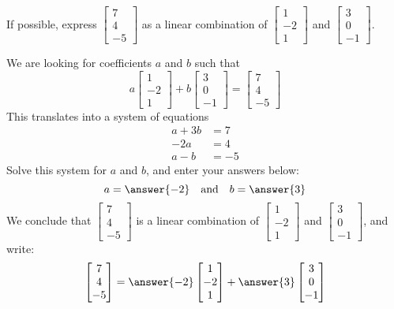 \documentclass{ximera}
\begin{document}
\begin{example}
If possible, express $\begin{bmatrix}7\\4\\-5\end{bmatrix}$ as a linear combination of $\begin{bmatrix}1\\-2\\1\end{bmatrix}$ and $\begin{bmatrix}3\\0\\-1\end{bmatrix}$.
\begin{explanation}
We are looking for coefficients $a$ and $b$ such that 
$$a\begin{bmatrix}1\\-2\\1\end{bmatrix}+b\begin{bmatrix}3\\0\\-1\end{bmatrix}=\begin{bmatrix}7\\4\\-5\end{bmatrix}$$
This translates into a system of equations
\begin{align*}
a+3b&=7\\
-2a&=4\\
a-b&=-5
\end{align*}
Solve this system for $a$ and $b$, and enter your answers below:
$$a=\answer{-2}\quad\text{and}\quad b=\answer{3}$$
We conclude that $\begin{bmatrix}7\\4\\-5\end{bmatrix}$ is a linear combination of $\begin{bmatrix}1\\-2\\1\end{bmatrix}$ and $\begin{bmatrix}3\\0\\-1\end{bmatrix}$, and write:
$$\begin{bmatrix}7\\4\\-5\end{bmatrix}=\answer{-2}\begin{bmatrix}1\\-2\\1\end{bmatrix}+\answer{3}\begin{bmatrix}3\\0\\-1\end{bmatrix}$$
\end{explanation}
\end{example}
\end{document}
